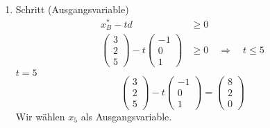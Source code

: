 \documentclass[a4paper]{scrartcl}
\begin{document}
\begin{enumerate}[label=\bfseries\arabic*.]
\begin{enumerate}
\begin{enumerate}[1.]
\begin{enumerate}[1.]
                            \item Schritt (Ausgangsvariable)
                                \begin{equation}
                                    \begin{split}
                                        x_B^* - td &\geq 0 \\
                                        \begin{pmatrix}
                                            3 \\ 2 \\ 5
                                        \end{pmatrix}
                                        - t
                                        \begin{pmatrix}
                                            -1 \\ 0 \\ 1
                                        \end{pmatrix}
                                        &\geq 0
                                        \quad\Rightarrow\quad
                                        t \leq 5
                                    \end{split}
                                \end{equation}
                                $t = 5$
                                \begin{equation}
                                    \begin{pmatrix}
                                        3 \\ 2 \\ 5
                                    \end{pmatrix}
                                    - t
                                    \begin{pmatrix}
                                        -1 \\ 0 \\ 1
                                    \end{pmatrix}
                                    =
                                    \begin{pmatrix}
                                        8 \\ 2 \\ 0
                                    \end{pmatrix}
                                \end{equation}
                                Wir wählen $x_5$ als Ausgangsvariable.


\end{enumerate}
\end{enumerate}
\end{enumerate}
\end{enumerate}
\end{document}

